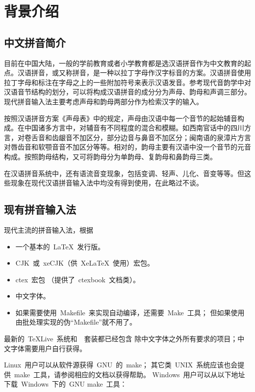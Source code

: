 \chapter{背景介绍}
	\section{中文拼音简介}

	目前在中国大陆，一般的学前教育或者小学教育都是选汉语拼音作为中文教育的起点。汉语拼音，或又称拼音，是一种以拉丁字母作汉字标音的方案。\supercite{wjm}汉语拼音使用拉丁字母和标注在字母之上的一些附加符号来表示汉语发音。参考现代音韵学中对汉语音节结构的划分，可以将构成汉语拼音的成分分为声母、韵母和声调三部分。现代拼音输入法主要考虑声母和韵母两部分作为检索汉字的输入。

	按照汉语拼音方案《声母表》中的规定，声母由汉语中每一个音节的起始辅音构成。在中国诸多方言中，对辅音有不同程度的混合和模糊。如西南官话中的四川方言，对卷舌音和齿龈音不加区分，部分边音与鼻音不加区分；闽南语的泉漳片方言对唇齿音和软颚音音不加区分等等。\supercite{jdp}相对的，韵母主要有汉语中没一个音节的元音构成。按照韵母结构，又可将韵母分为单韵母、复韵母和鼻韵母三类。

	在汉语拼音系统中，还有语流音变现象，包括变调、轻声、儿化、音变等等。但这些现象在现代汉语拼音输入法中均没有得到使用，在此略过不谈。

	\section{现有拼音输入法}

	现代主流的拼音输入法，根据
	\begin{itemize}\denselist
		\item 一个基本的~\LaTeX{}~发行版。
		\item CJK~或~xeCJK（供~Xe\LaTeX{}~使用）宏包。
		\item ctex~宏包\supercite{ctex-doc,ctexfaq}%
			（提供了~ctexbook~文档类）。
		\item 中文字体。
		\item 如果需要使用~Makefile~来实现自动编译，还需要~Make~工具；
			但如果使用由批处理实现的伪“Makefile”就不用了。
	\end{itemize}

	最新的~\TeX{}Live~系统和~\CTeX~套装都已经包含%
	除中文字体之外所有要求的项目；中文字体需要用户自行获得。

	Linux~用户可以从软件源获得~GNU~的~make；
	其它类~UNIX~系统应该也会提供~make~工具，请参阅相应的文档以获得帮助。
	Windows~用户可以从以下地址下载~Windows~下的~GNU make~工具：

